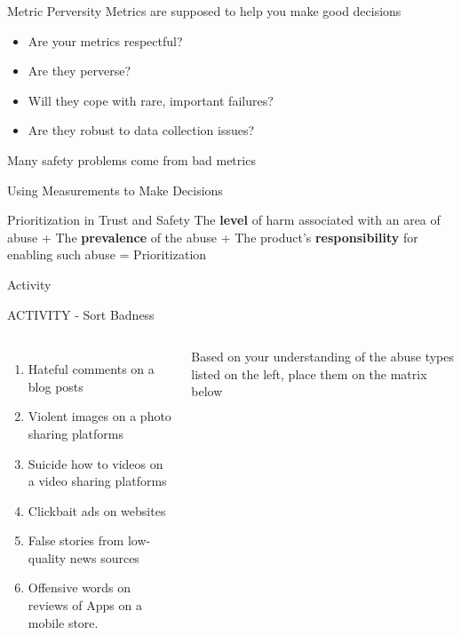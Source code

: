 \documentclass[nobackground,dvipsnames,table]{beamer}
\begin{document}
\begin{frame}{Metric Perversity}
    Metrics are supposed to help you make good decisions \\
    \begin{itemize}
        \item Are your metrics respectful?
        \item Are they perverse?
        \item Will they cope with rare, important failures?
        \item Are they robust to data collection issues?
    \end{itemize}

    Many safety problems come from bad metrics
\end{frame}

\begin{frame}{Using Measurements to Make Decisions}
\end{frame}

\begin{frame}{Prioritization in Trust and Safety}
    \centering
    The \textbf{level} of harm associated with an area of abuse
    +
    The \textbf{prevalence} of the abuse 
    +
    The product’s \textbf{responsibility} for enabling such abuse
    =
    Prioritization %
\end{frame}

\begin{frame}{}
    \thispagestyle{empty}
    Activity
\end{frame}

\begin{frame}{ACTIVITY - Sort Badness}
    \begin{columns}
            \begin{enumerate}
                \item Hateful comments on a blog posts
                \item Violent images on a photo sharing platforms \item Suicide how to videos on a video sharing platforms
                \item Clickbait ads on websites
                \item False stories from low-quality news sources
                \item Offensive words on reviews of Apps on a mobile store.
            \end{enumerate}
            Based on your understanding of the abuse types listed on the left, place them on the matrix below 
    \end{columns}
\end{frame}
\end{document}
